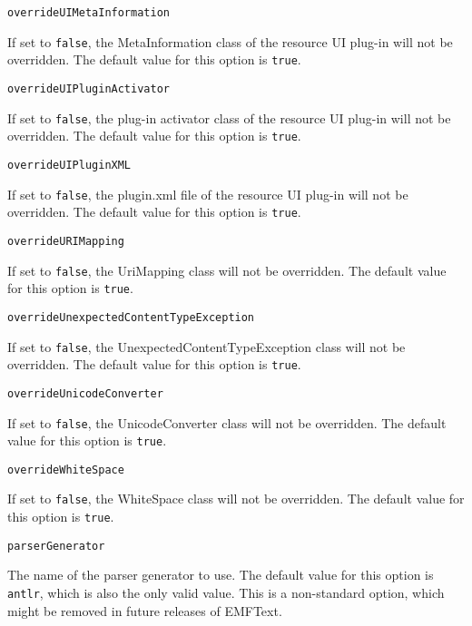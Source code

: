 \noindent\texttt{overrideUIMetaInformation}
\begin{myindentpar}{1cm}
If set to \texttt{false}, the MetaInformation class of the resource UI plug-in will not be overridden. The default value for this option is \texttt{true}.
\end{myindentpar}

\noindent\texttt{overrideUIPluginActivator}
\begin{myindentpar}{1cm}
If set to \texttt{false}, the plug-in activator class of the resource UI plug-in will not be overridden. The default value for this option is \texttt{true}.
\end{myindentpar}

\noindent\texttt{overrideUIPluginXML}
\begin{myindentpar}{1cm}
If set to \texttt{false}, the plugin.xml file of the resource UI plug-in will not be overridden. The default value for this option is \texttt{true}.
\end{myindentpar}

\noindent\texttt{overrideURIMapping}
\begin{myindentpar}{1cm}
If set to \texttt{false}, the UriMapping class will not be overridden. The default value for this option is \texttt{true}.
\end{myindentpar}

\noindent\texttt{overrideUnexpectedContentTypeException}
\begin{myindentpar}{1cm}
If set to \texttt{false}, the UnexpectedContentTypeException class will not be overridden. The default value for this option is \texttt{true}.
\end{myindentpar}

\noindent\texttt{overrideUnicodeConverter}
\begin{myindentpar}{1cm}
If set to \texttt{false}, the UnicodeConverter class will not be overridden. The default value for this option is \texttt{true}.
\end{myindentpar}

\noindent\texttt{overrideWhiteSpace}
\begin{myindentpar}{1cm}
If set to \texttt{false}, the WhiteSpace class will not be overridden. The default value for this option is \texttt{true}.
\end{myindentpar}

\noindent\texttt{parserGenerator}
\begin{myindentpar}{1cm}
The name of the parser generator to use. The default value for this option is \texttt{antlr}, which is also the only valid value. This is a non-standard option, which might be removed in future releases of EMFText.
\end{myindentpar}

